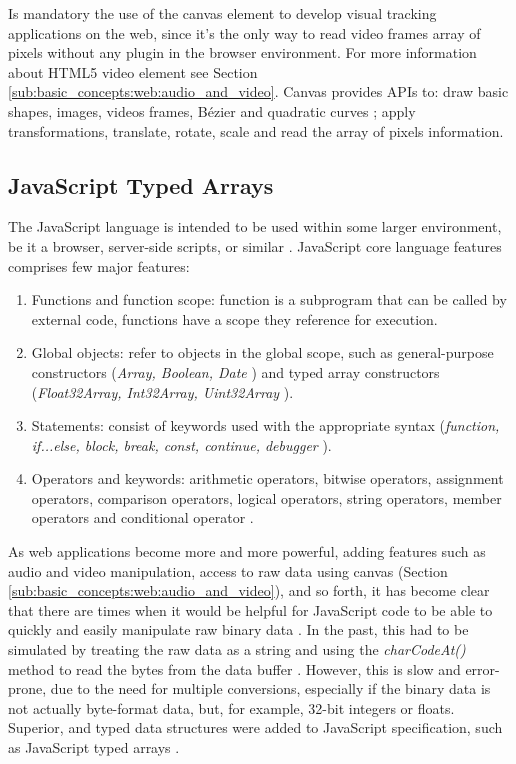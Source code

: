 Is mandatory the use of the canvas element \cite{Canvas2013} to develop visual tracking applications on the web, since it's the only way to read video frames array of pixels without any plugin in the browser environment. For more information about HTML5 \cite{Hickson2013} video element see Section \ref{sub:basic_concepts:web:audio_and_video}. Canvas provides APIs to: draw basic shapes, images, videos frames, Bézier \cite{piegl1993fundamental} and quadratic curves \cite{piegl1993fundamental,Hartley2004}; apply transformations, translate, rotate, scale and read the array of pixels information.


\subsection{JavaScript Typed Arrays} %
\label{sub:basic_concepts:web:javascript_typed_arrays}

The JavaScript language \cite{International2009} is intended to be used within some larger environment, be it a browser, server-side scripts, or similar \cite{Grosskurth2005}. JavaScript \cite{International2009} core language features comprises few major features:

\begin{enumerate}
\item Functions and function scope: function is a subprogram that can be called by external code, functions have a scope they reference for execution.
\item Global objects: refer to objects in the global scope, such as general-purpose constructors (\textit{Array, Boolean, Date} \etc) and typed array constructors (\textit{Float32Array, Int32Array, Uint32Array} \etc).
\item Statements: consist of keywords used with the appropriate syntax (\textit{function, if...else, block, break, const, continue, debugger \etc}).
\item Operators and keywords: arithmetic operators, bitwise operators, assignment operators, comparison operators, logical operators, string operators, member operators and conditional operator \cite{MDN2013}.
\end{enumerate}

As web applications become more and more powerful, adding features such as audio and video manipulation, access to raw data using canvas (Section \ref{sub:basic_concepts:web:audio_and_video}), and so forth, it has become clear that there are times when it would be helpful for JavaScript \cite{International2009} code to be able to quickly and easily manipulate raw binary data \cite{Canvas2013,TypedArray2013}. In the past, this had to be simulated by treating the raw data as a string and using the \textit{charCodeAt()} method to read the bytes from the data buffer \cite{MDN2013,TypedArray2013}. However, this is slow and error-prone, due to the need for multiple conversions, especially if the binary data is not actually byte-format data, but, for example, 32-bit integers or floats. Superior, and typed data structures were added to JavaScript specification, such as JavaScript typed arrays \cite{MDN2013,International2009}.

